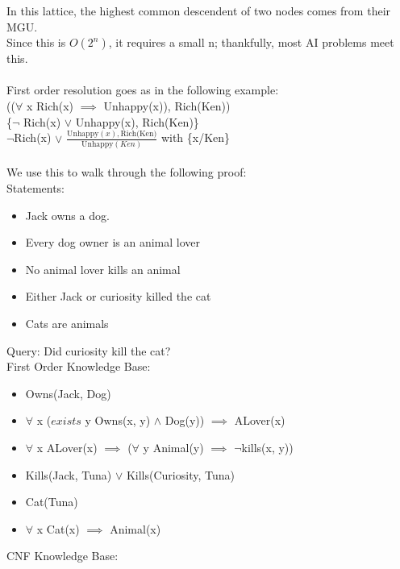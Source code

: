 \documentclass[../../lecture_notes.tex]{subfiles}
\begin{document}
In this lattice, the highest common descendent of two nodes comes from their MGU.\\
Since this is $O(2^n)$, it requires a small n; thankfully, most AI problems meet this.\\
\\
First order resolution goes as in the following example:\\
	\indent (($\forall$ x Rich(x) $\implies$ Unhappy(x)), Rich(Ken))\\
	\indent \{$\neg$ Rich(x) $\lor$ Unhappy(x), Rich(Ken)\}\\
	\indent $\neg$Rich(x) $\lor$ $\frac{\text{Unhappy}(x), \text{Rich(Ken)}} {\text{Unhappy}(Ken)}$ with \{x/Ken\}\\
\\
We use this to walk through the following proof:\\
	\indent Statements:
		\begin{itemize} [itemsep=0mm]
			\item Jack owns a dog.
			\item Every dog owner is an animal lover
			\item No animal lover kills an animal
			\item Either Jack or curiosity killed the cat
			\item Cats are animals
		\end{itemize}
	\indent Query: Did curiosity kill the cat?\\
	\indent First Order Knowledge Base:
		\begin{itemize} [itemsep=0mm]
			\item Owns(Jack, Dog)
			\item $\forall$ x ($exists$ y Owns(x, y) $\land$ Dog(y)) $\implies$ ALover(x)
			\item $\forall$ x ALover(x) $\implies$ ($\forall$ y Animal(y) $\implies$ $\neg$kills(x, y))
			\item Kills(Jack, Tuna) $\lor$ Kills(Curiosity, Tuna)
			\item Cat(Tuna)
			\item $\forall$ x Cat(x) $\implies$ Animal(x)
		\end{itemize}
	\indent CNF Knowledge Base:
\end{document}
